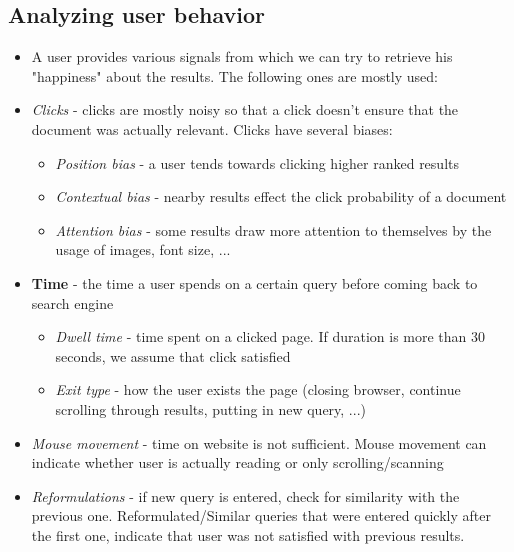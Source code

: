 \subsection{Analyzing user behavior}
\begin{itemize}
	\item A user provides various signals from which we can try to retrieve his "happiness" about the results. The following ones are mostly used:
	\item \textit{Clicks} - clicks are mostly noisy so that a click doesn't ensure that the document was actually relevant. Clicks have several biases:
	\begin{itemize}
		\item \textit{Position bias} - a user tends towards clicking higher ranked results
		\item \textit{Contextual bias} - nearby results effect the click probability of a document
		\item \textit{Attention bias} - some results draw more attention to themselves by the usage of images, font size, ...
	\end{itemize}
	\item \textbf{Time} - the time a user spends on a certain query before coming back to search engine
	\begin{itemize}
		\item \textit{Dwell time} - time spent on a clicked page. If duration is more than 30 seconds, we assume that click satisfied
		\item \textit{Exit type} - how the user exists the page (closing browser, continue scrolling through results, putting in new query, ...) 
	\end{itemize}
	\item \textit{Mouse movement} - time on website is not sufficient. Mouse movement can indicate whether user is actually reading or only scrolling/scanning
	\item \textit{Reformulations} - if new query is entered, check for similarity with the previous one. Reformulated/Similar queries that were entered quickly after the first one, indicate that user was not satisfied with previous results.
\end{itemize}
